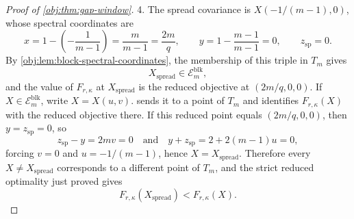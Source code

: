 \documentclass[11pt]{article}
\begin{document}
\begin{proof}[Proof of \cref{obj:thm:gap-window}]
4.  The spread covariance is \(X(-1/(m-1),0)\), whose spectral coordinates are
\[
x=1-\left(-\frac1{m-1}\right)=\frac{m}{m-1}=\frac{2m}{q},\qquad
y=1-\frac{m-1}{m-1}=0,\qquad
z_{\mathrm{sp}}=0.
\]
By \cref{obj:lem:block-spectral-coordinates}, the membership of this triple in \(T_m\) gives
\[
X_{\mathrm{spread}}\in\mathcal E_m^{\mathrm{blk}},
\]
and the value of \(F_{r,\kappa}\) at \(X_{\mathrm{spread}}\) is the reduced objective at
\((2m/q,0,0)\). If \(X\in\mathcal E_m^{\mathrm{blk}}\), write \(X=X(u,v)\).  sends it to a point of \(T_m\) and identifies \(F_{r,\kappa}(X)\) with the reduced objective there. If this reduced point equals \((2m/q,0,0)\), then \(y=z_{\mathrm{sp}}=0\), so
\[
z_{\mathrm{sp}}-y=2mv=0
\quad\text{and}\quad
y+z_{\mathrm{sp}}=2+2(m-1)u=0,
\]
forcing \(v=0\) and \(u=-1/(m-1)\), hence \(X=X_{\mathrm{spread}}\). Therefore every \(X\ne X_{\mathrm{spread}}\) corresponds to a different point of \(T_m\), and the strict reduced optimality just proved gives
\[
F_{r,\kappa}(X_{\mathrm{spread}})<F_{r,\kappa}(X).
\]  %


\end{proof}
\end{document}
